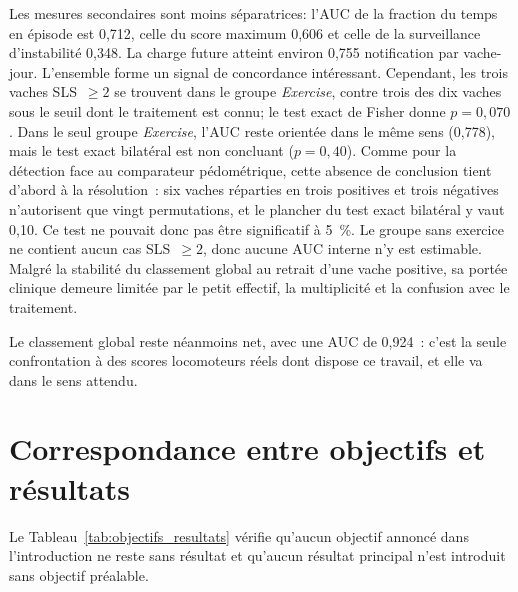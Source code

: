 Les mesures secondaires sont moins séparatrices: l'AUC de la fraction du temps en épisode
est 0,712, celle du score maximum 0,606 et celle de la surveillance d'instabilité 0,348. La
charge future atteint environ 0,755 notification par vache-jour. L'ensemble forme un signal
de concordance intéressant. Cependant, les trois vaches SLS~$\geq2$ se trouvent dans le
groupe \textit{Exercise}, contre trois des dix vaches sous le seuil dont le traitement est
connu; le test exact de Fisher donne $p=0{,}070$. Dans le seul groupe
\textit{Exercise}, l'AUC reste orientée dans le même sens (0,778), mais le test exact
bilatéral est non concluant ($p=0{,}40$). Comme pour la détection face au comparateur
pédométrique, cette absence de conclusion tient d'abord à la résolution~: six vaches réparties
en trois positives et trois négatives n'autorisent que vingt permutations, et le plancher du
test exact bilatéral y vaut 0,10. Ce test ne pouvait donc pas être significatif à 5~\%. Le
groupe sans exercice ne contient aucun cas
SLS~$\geq2$, donc aucune AUC interne n'y est estimable. Malgré la stabilité du classement
global au retrait d'une vache positive, sa portée clinique demeure limitée par le petit
effectif, la multiplicité et la confusion avec le traitement.

Le classement global reste néanmoins net, avec une AUC de 0,924~: c'est la seule confrontation
à des scores locomoteurs réels dont dispose ce travail, et elle va dans le sens attendu.

\section{Correspondance entre objectifs et résultats}
Le Tableau~\ref{tab:objectifs_resultats} vérifie qu'aucun objectif annoncé dans
l'introduction ne reste sans résultat et qu'aucun résultat principal n'est introduit sans
objectif préalable.


